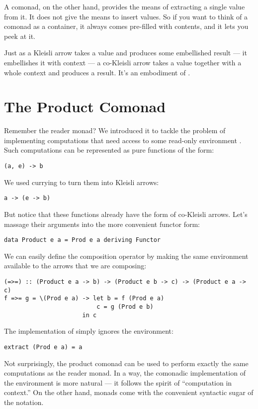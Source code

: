 A comonad, on the other hand, provides the means of extracting a single
value from it. It does not give the means to insert values. So if you
want to think of a comonad as a container, it always comes pre-filled
with contents, and it lets you peek at it.

Just as a Kleisli arrow takes a value and produces some embellished
result --- it embellishes it with context --- a co-Kleisli arrow takes a
value together with a whole context and produces a result. It's an
embodiment of .

\section{The Product Comonad}

Remember the reader monad? We introduced it to tackle the problem of
implementing computations that need access to some read-only environment
. Such computations can be represented as pure functions of
the form:

\begin{Verbatim}
(a, e) -> b
\end{Verbatim}
We used currying to turn them into Kleisli arrows:

\begin{Verbatim}
a -> (e -> b)
\end{Verbatim}
But notice that these functions already have the form of co-Kleisli
arrows. Let's massage their arguments into the more convenient functor
form:

\begin{Verbatim}
data Product e a = Prod e a deriving Functor
\end{Verbatim}
We can easily define the composition operator by making the same
environment available to the arrows that we are composing:

\begin{verbatim}
(=>=) :: (Product e a -> b) -> (Product e b -> c) -> (Product e a -> c)
f =>= g = \(Prod e a) -> let b = f (Prod e a)
                          c = g (Prod e b) 
                      in c
\end{verbatim}
The implementation of  simply ignores the environment:

\begin{Verbatim}
extract (Prod e a) = a
\end{Verbatim}
Not surprisingly, the product comonad can be used to perform exactly the
same computations as the reader monad. In a way, the comonadic
implementation of the environment is more natural --- it follows the
spirit of ``computation in context.'' On the other hand, monads come
with the convenient syntactic sugar of the  notation.

